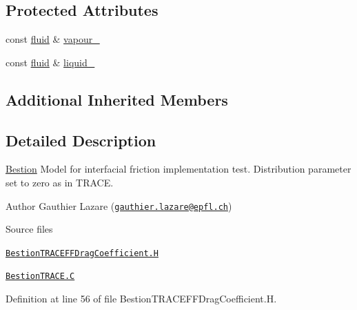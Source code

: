 \subsection*{Protected Attributes}
\begin{DoxyCompactItemize}
\item 
const \hyperlink{classFoam_1_1fluid}{fluid} \& \hyperlink{classFoam_1_1FFDragCoefficientModels_1_1BestionTRACE_a2675e35060f71c22823e4a0b3c816dad}{vapour\+\_\+}
\item 
const \hyperlink{classFoam_1_1fluid}{fluid} \& \hyperlink{classFoam_1_1FFDragCoefficientModels_1_1BestionTRACE_a908415555f3c334379400a3eb5759639}{liquid\+\_\+}
\end{DoxyCompactItemize}
\subsection*{Additional Inherited Members}


\subsection{Detailed Description}
\hyperlink{classFoam_1_1FFDragCoefficientModels_1_1Bestion}{Bestion} Model for interfacial friction implementation test. Distribution parameter set to zero as in T\+R\+A\+CE. 

\label{_Description}%
 Author Gauthier Lazare (\href{mailto:gauthier.lazare@epfl.ch}{\tt gauthier.\+lazare@epfl.\+ch})

\begin{DoxyParagraph}{Source files}

\begin{DoxyItemize}
\item \href{../../../home/carlo/data/GeN-Foam/GeN-Foam_ffn/GeN-Foam/GeN-Foam/classes/thermalHydraulics/src/physicsModels/dragModels/FFDragCoefficientModels/BestionTRACE/BestionTRACEFFDragCoefficient.H}{\tt Bestion\+T\+R\+A\+C\+E\+F\+F\+Drag\+Coefficient.\+H} 
\item \href{../../../home/carlo/data/GeN-Foam/GeN-Foam_ffn/GeN-Foam/GeN-Foam/classes/thermalHydraulics/src/physicsModels/dragModels/FFDragCoefficientModels/BestionTRACE/BestionTRACE.C}{\tt Bestion\+T\+R\+A\+C\+E.\+C} 
\end{DoxyItemize}
\end{DoxyParagraph}


Definition at line 56 of file Bestion\+T\+R\+A\+C\+E\+F\+F\+Drag\+Coefficient.\+H.



